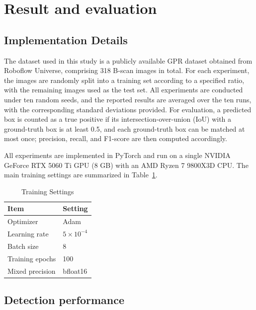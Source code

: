 \documentclass[lettersize,journal]{IEEEtran}
\begin{document}
\section{Result and evaluation}
\subsection{Implementation Details}
The dataset used in this study is a publicly available GPR dataset obtained from Roboflow Universe, 
comprising 318 B-scan images in total.
For each experiment, the images are randomly split into a training set according to a specified ratio, 
with the remaining images used as the test set. All experiments are conducted under ten random seeds, 
and the reported results are averaged over the ten runs,
with the corresponding standard deviations provided.
For evaluation, a predicted box is counted as a true positive if its intersection-over-union (IoU)
with a ground-truth box is at least 0.5, and each ground-truth box can be matched at most once;
precision, recall, and F1-score are then computed accordingly.

All experiments are implemented in PyTorch and run on a single NVIDIA GeForce RTX 5060 Ti GPU (8 GB)
with an AMD Ryzen 7 9800X3D CPU.
The main training settings are summarized in Table~\ref{tab:impl}.

\begin{table}[]
\caption{Training Settings}
\label{tab:impl}
\centering
\begin{tabular}{ll}
\toprule
Item & Setting \\
\midrule
Optimizer & Adam \\
Learning rate & $5\times10^{-4}$ \\
Batch size & 8 \\
Training epochs & 100 \\
Mixed precision & bfloat16 \\
\bottomrule
\end{tabular}
\end{table}

\subsection{Detection performance}
\end{document}
